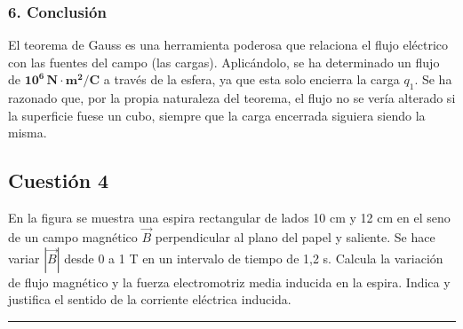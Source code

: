 \subsubsection*{6. Conclusión}
\begin{cajaconclusion}
El teorema de Gauss es una herramienta poderosa que relaciona el flujo eléctrico con las fuentes del campo (las cargas). Aplicándolo, se ha determinado un flujo de $\mathbf{10^6\,N \cdot m^2/C}$ a través de la esfera, ya que esta solo encierra la carga $q_1$. Se ha razonado que, por la propia naturaleza del teorema, el flujo no se vería alterado si la superficie fuese un cubo, siempre que la carga encerrada siguiera siendo la misma.
\end{cajaconclusion}

\newpage

\subsection{Cuestión 4}
\label{subsec:C4_2020_sep_ext}

\begin{cajaenunciado}
En la figura se muestra una espira rectangular de lados 10 cm y 12 cm en el seno de un campo magnético $\vec{B}$ perpendicular al plano del papel y saliente. Se hace variar $|\vec{B}|$ desde 0 a 1 T en un intervalo de tiempo de 1,2 s. Calcula la variación de flujo magnético y la fuerza electromotriz media inducida en la espira. Indica y justifica el sentido de la corriente eléctrica inducida.
\end{cajaenunciado}
\hrule

